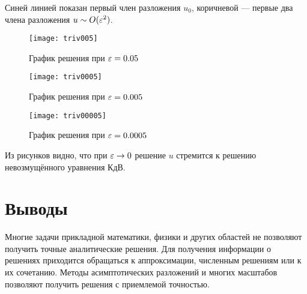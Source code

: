 Синей линией показан первый член разложения $u_0$,
коричневой --- первые два члена разложения $u \sim O(\varepsilon^2)$.

\begin{figure}[H]
    \centering
    \texttt{[image: triv005]}
    \caption{График решения при $\varepsilon = 0.05$}
\end{figure}
\begin{figure}[H]
    \centering
    \texttt{[image: triv0005]}
    \caption{График решения при $\varepsilon = 0.005$}
\end{figure}
\begin{figure}[H]
    \centering
    \texttt{[image: triv00005]}
    \caption{График решения при $\varepsilon = 0.0005$}
\end{figure}

Из рисунков видно, что при $\varepsilon \to 0$
решение $u$ стремится к решению невозмущённого уравнения КдВ.

\section*{Выводы}

Многие задачи прикладной математики, физики
и других областей не позволяют получить точные аналитические решения.
Для получения информации о решениях приходится обращаться к аппроксимации,
численным решениям или к их сочетанию.
Методы асимптотических разложений и
многих масштабов позволяют получить решения с приемлемой точностью.

